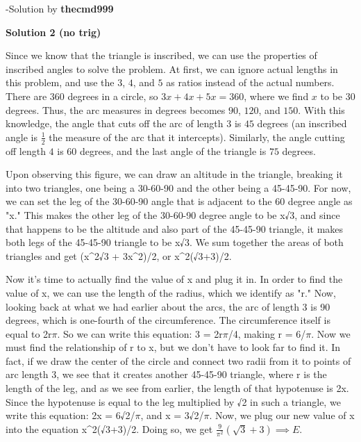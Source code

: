 \begin{enumerate}
 
-Solution by \textbf{thecmd999}

 



\textbf{Solution 2 (no trig)}

Since we know that the triangle is inscribed, we can use the properties of inscribed angles to solve the problem. At first, we can ignore actual lengths in this problem, and use the $3$, $4$, and $5$ as ratios instead of the actual numbers. There are $360$ degrees in a circle, so $3x + 4x + 5x = 360$, where we find $x$ to be $30$ degrees. Thus, the arc measures in degrees becomes $90$, $120$, and $150$. With this knowledge, the angle that cuts off the arc of length $3$ is $45$ degrees (an inscribed angle is $\frac{1}{2}$ the measure of the arc that it intercepts). Similarly, the angle cutting off length $4$ is $60$ degrees, and the last angle of the triangle is $75$ degrees. 

 Upon observing this figure, we can draw an altitude in the triangle, breaking it into two triangles, one being a 30-60-90 and the other being a 45-45-90. For now, we can set the leg of the 30-60-90 angle that is adjacent to the 60 degree angle as "x." This makes the other leg of the 30-60-90 degree angle to be x√3, and since that happens to be the altitude and also part of the 45-45-90 triangle, it makes both legs of the 45-45-90 triangle to be x√3. We sum together the areas of both triangles and get (x\textasciicircum{}2√3 + 3x\textasciicircum{}2)/2, or x\textasciicircum{}2(√3+3)/2.

 Now it's time to actually find the value of x and plug it in. In order to find the value of x, we can use the length of the radius, which we identify as "r." Now, looking back at what we had earlier about the arcs, the arc of length 3 is 90 degrees, which is one-fourth of the circumference. The circumference itself is equal to 2r$\pi$. So we can write this equation: 3 = 2r$\pi$/4, making r = 6/$\pi$. Now we must find the relationship of r to x, but we don't have to look far to find it. In fact, if we draw the center of the circle and connect two radii from it to points of arc length 3, we see that it creates another 45-45-90 triangle, where r is the length of the leg, and as we see from earlier, the length of that hypotenuse is 2x. Since the hypotenuse is equal to the leg multiplied by √2 in such a triangle, we write this equation: 2x = 6√2/$\pi$, and x = 3√2/$\pi$. Now, we plug our new value of x into the equation x\textasciicircum{}2(√3+3)/2. Doing so, we get $\frac{9}{\pi^2}(\sqrt{3}+3)\implies{\boxed{E}}$.


\end{enumerate}
